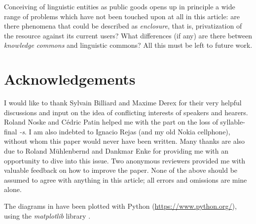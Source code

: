 \documentclass[output=paper,hidelinks]{langscibook}
\begin{document}
Conceiving of linguistic entities as public goods opens up in principle a wide range of problems which have not been touched upon at all in this article: are there phenomena that could be described as \emph{enclosure}, that is, privatization of the resource against its current users? What differences (if any) are there between \emph{knowledge commons} \citep[see][]{hessostrom07} and linguistic commons? All this must be left to future work.


\section*{Acknowledgements}

I would like to thank Sylvain Billiard and Maxime Derex for their very helpful discussions and input on the idea of conflicting interests of speakers and hearers. Roland Noske and Cédric Patin helped me with the part on the loss of syllable-final \emph{-s}. I am also indebted to Ignacio Rejas (and my old Nokia cellphone), without whom this paper would never have been written. Many thanks are also due to Roland Mühlenbernd and Dankmar Enke for providing me with an opportunity to dive into this issue. Two anonymous reviewers provided me with valuable feedback on how to improve the paper. None of the above should be assumed to agree with anything in this article; all errors and omissions are mine alone.

The diagrams in  have been plotted with Python (\url{https://www.python.org/}), using the \emph{matplotlib} library \citep[see][]{Hunter:2007}.

{\sloppy\printbibliography[heading=subbibliography,notkeyword=this]}
\end{document}
